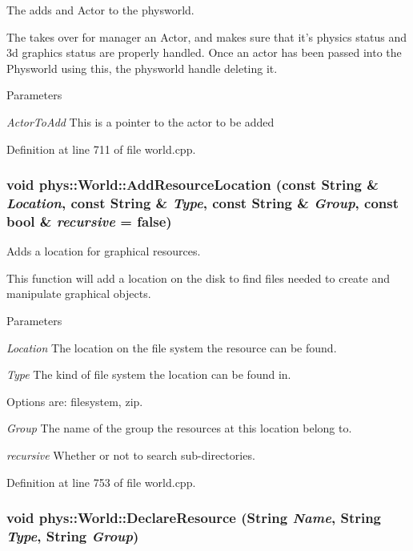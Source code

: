 The adds and Actor to the physworld. 

The takes over for manager an Actor, and makes sure that it's physics status and 3d graphics status are properly handled. Once an actor has been passed into the Physworld using this, the physworld handle deleting it. 
\begin{DoxyParams}{Parameters}
\item[{\em ActorToAdd}]This is a pointer to the actor to be added \end{DoxyParams}


Definition at line 711 of file world.cpp.

\hypertarget{classphys_1_1World_ab26033088abe4d60a40cf770dd1b0de8}{
\subsubsection[{AddResourceLocation}]{\setlength{\rightskip}{0pt plus 5cm}void phys::World::AddResourceLocation (const {\bf String} \& {\em Location}, \/  const {\bf String} \& {\em Type}, \/  const {\bf String} \& {\em Group}, \/  const bool \& {\em recursive} = {\ttfamily false})}}
\label{da/ddf/classphys_1_1World_ab26033088abe4d60a40cf770dd1b0de8}


Adds a location for graphical resources. 

This function will add a location on the disk to find files needed to create and manipulate graphical objects. 
\begin{DoxyParams}{Parameters}
\item[{\em Location}]The location on the file system the resource can be found. \item[{\em Type}]The kind of file system the location can be found in. \par
 Options are: filesystem, zip. \item[{\em Group}]The name of the group the resources at this location belong to. \item[{\em recursive}]Whether or not to search sub-\/directories. \end{DoxyParams}


Definition at line 753 of file world.cpp.

\hypertarget{classphys_1_1World_ad8c9834c1b9a0de437a0b29f17c0c48e}{
\subsubsection[{DeclareResource}]{\setlength{\rightskip}{0pt plus 5cm}void phys::World::DeclareResource ({\bf String} {\em Name}, \/  {\bf String} {\em Type}, \/  {\bf String} {\em Group})}}
\label{da/ddf/classphys_1_1World_ad8c9834c1b9a0de437a0b29f17c0c48e}


